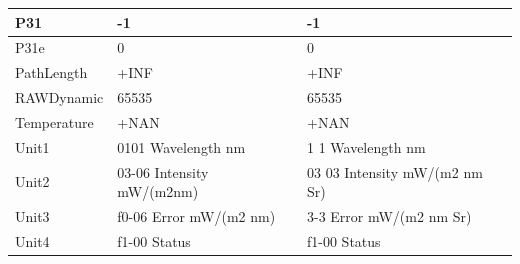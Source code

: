 \documentclass[11pt]{article}
\begin{document}
\begin{appendices}
\begin{table}[H]
\begin{tabular}{| p{3cm} | p{3cm} | p{5cm} |}
		    P31 & -1 & -1 \\ \hline
		   P31e & 0 & 0 \\ \hline
		   PathLength & +INF & +INF \\ \hline
		   RAWDynamic & 65535 & 65535 \\ \hline
		   Temperature & +NAN & +NAN \\ \hline
		   Unit1 & 0101 Wavelength nm &  1 1 Wavelength nm \\ \hline
		   Unit2 & 03-06 Intensity mW/(m2nm) & 03 03 Intensity mW/(m2 nm Sr) \\ \hline
		   Unit3 & f0-06 Error mW/(m2 nm) & 3-3 Error mW/(m2 nm Sr) \\ \hline
		  Unit4 & f1-00 Status & f1-00 Status \\ \hline
	  \end{tabular}	
\end{table}
\pagebreak


\end{appendices}
\end{document}
